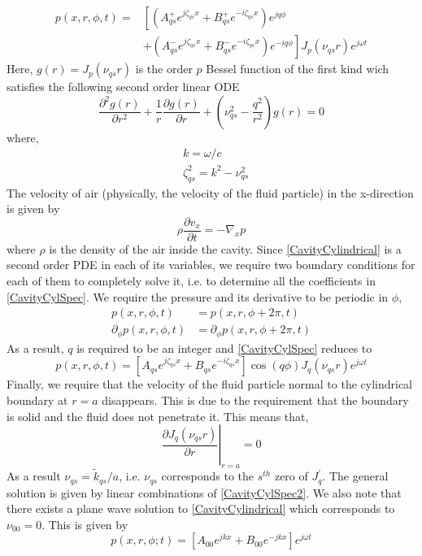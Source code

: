 \begin{align}\label{CavityCylSpec}
p(x,r,\phi,t)=&\left[\left(A^+_{qs}e^{j\zeta_{qs}x} + B^+_{qs}e^{-i\zeta_{qs}x}\right)e^{jq\phi}\right.\nonumber\\
                    &+\left.\left(A^-_{qs}e^{j\zeta_{qs}x}+B^-_{qs}e^{-i\zeta_{qs}x}\right)e^{-iq\phi}\right] J_p(\nu_{qs}r)e^{j\omega t}
\end{align}
Here, $g(r)=J_p(\nu_{qs}r)$ is the order $p$ Bessel function of the first kind wich satisfies the following
second order linear ODE
\begin{equation}\label{besseleqn}
 \frac{\partial^2 g(r)}{\partial r^2}+\frac{1}{r}\frac{\partial g(r)}{\partial r}+\left(\nu^2_{qs}-\frac{q^2}{r^2}\right)g(r)=0
\end{equation}
where, 
\begin{align}
&k=\omega/c\\
&\zeta^2_{qs}=k^2-\nu^2_{qs}\label{wavenumbers}
\end{align}
The velocity of air (physically, the velocity of the fluid particle) in the x-direction is given by
\begin{equation}\label{airvelocity}
 \rho\frac{\partial v_x}{\partial t}=-\nabla_x p
\end{equation}
 where $\rho$ is the density of the air inside the cavity. Since \eqref{CavityCylindrical} is 
a second order PDE in each of its variables, we require two boundary conditions for each of them 
to completely solve it, i.e. to determine all the coefficients in \eqref{CavityCylSpec}. We require
the pressure and its derivative to be periodic in $\phi$, 
\begin{align}
 p(x,r,\phi,t)&=p(x,r,\phi+2\pi,t)\label{phboundary1}\\
 \partial_\phi p(x,r,\phi,t)&=\partial_\phi p(x,r,\phi+2\pi,t)\label{phboundary2}
\end{align}
As a result, $q$ is required to be an integer and \eqref{CavityCylSpec} reduces to
\begin{equation}\label{CavityCylSpec2}
 p(x,r,\phi,t)=\left[A_{qs}e^{j\zeta_{qs}x}+B_{qs}e^{-i\zeta_{qs}x}\right]\cos(q\phi) J_q(\nu_{qs}r)e^{j\omega t}
\end{equation}
Finally, we require that the velocity of the fluid particle normal to the cylindrical boundary at
$r=a$ disappears. This is due to the requirement that the boundary is solid and the fluid does not
penetrate it. This means that,
\begin{equation}\label{normalboundary}
 \left.\frac{\partial J_q(\nu_{qs}r)}{\partial r}\right|_{r=a}=0
\end{equation}
As a result $\nu_{qs}=\widetilde{k}_{qs}/a$, i.e. $\nu_{qs}$ corresponds to the $s^{th}$ zero of $J^\prime_q$. The general solution is given by linear combinations of \eqref{CavityCylSpec2}. 
We also note that there exists a plane wave solution to \eqref{CavityCylindrical} which corresponds to
$\nu_{00}=0$. This is given by
\begin{equation}\label{CylinderPlaneWave}
 p(x,r,\phi;t)=\left[A_{00}e^{jkx}+B_{00}e^{-jkx}\right]e^{j\omega t}
\end{equation}

